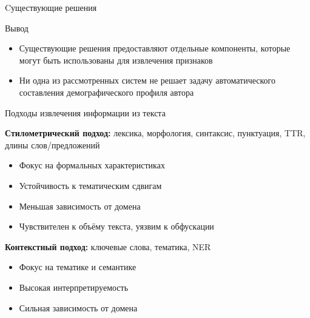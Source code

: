 \documentclass[10pt]{beamer}
\begin{document}
\begin{frame}{Cуществующие решения}
\footnotesize
\begin{table}[]
\centering
{}
\end{table}

\normalsize

\begin{block}{Вывод}
\begin{itemize}
\item Существующие решения предоставляют отдельные компоненты, которые могут быть использованы для извлечения признаков
\item Ни одна из рассмотренных систем не решает задачу автоматического составления демографического профиля автора
\end{itemize}
\end{block}
\end{frame}

\begin{frame}{Подходы извлечения информации из текста}

\textbf{Стилометрический подход:} лексика, морфология, синтаксис, пунктуация, TTR, длины слов/предложений
\begin{itemize}
\item Фокус на формальных характеристиках
\item Устойчивость к тематическим сдвигам
\item Меньшая зависимость от домена
\item Чувствителен к объёму текста, уязвим к обфускации
\end{itemize}

\textbf{Контекстный подход:} ключевые слова, тематика, NER
\begin{itemize}
\item Фокус на тематике и семантике
\item Высокая интерпретируемость
\item Сильная зависимость от домена
\end{itemize}
\end{frame}
\end{document}
